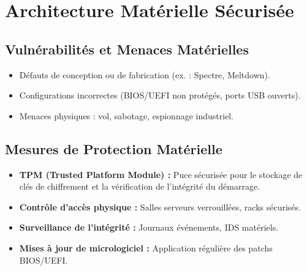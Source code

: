 \begin{center}
\end{center}

\section{Architecture Matérielle Sécurisée}

\subsection{Vulnérabilités et Menaces Matérielles}
\begin{itemize}
    \item Défauts de conception ou de fabrication (ex. : Spectre, Meltdown).
    \item Configurations incorrectes (BIOS/UEFI non protégés, ports USB ouverts).
    \item Menaces physiques : vol, sabotage, espionnage industriel.
\end{itemize}

\subsection{Mesures de Protection Matérielle}
\begin{itemize}
    \item \textbf{TPM (Trusted Platform Module) :} Puce sécurisée pour le stockage de clés de chiffrement et la vérification de l'intégrité du démarrage.
    \item \textbf{Contrôle d'accès physique :} Salles serveurs verrouillées, racks sécurisés.
    \item \textbf{Surveillance de l'intégrité :} Journaux événements, IDS matériels.
    \item \textbf{Mises à jour de micrologiciel :} Application régulière des patchs BIOS/UEFI.
\end{itemize}

